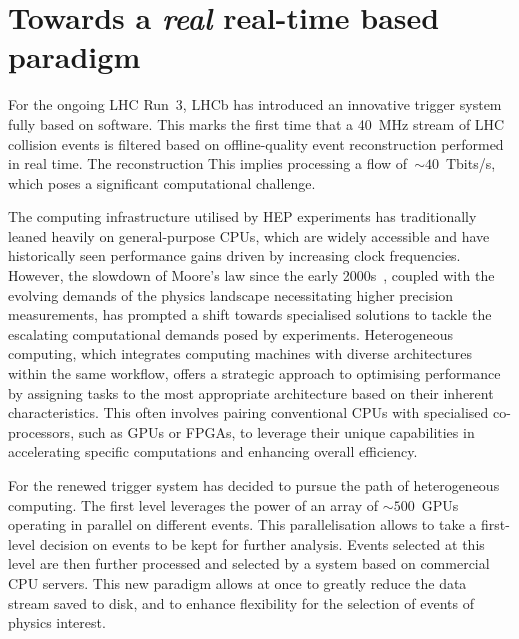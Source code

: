 \section{Towards a \textit{real} real-time based paradigm}
For the ongoing LHC Run~3, LHCb has introduced an innovative trigger system fully based on software. This marks the first time that a \SI{40}{\mega\hertz} stream of LHC collision events is filtered based on offline-quality event reconstruction performed in real time. The reconstruction This implies processing a flow of~$\sim 40$~Tbits/s, which poses a significant computational challenge. 

The computing infrastructure utilised by HEP experiments has traditionally leaned heavily on general-purpose CPUs, which are widely accessible and have historically seen performance gains driven by increasing clock frequencies. However, the slowdown of Moore's law since the early 2000s~\cite{Tuomi_2002}, coupled with the evolving demands of the physics landscape necessitating higher precision measurements, has prompted a shift towards specialised solutions to tackle the escalating computational demands posed by experiments. Heterogeneous computing, which integrates computing machines with diverse architectures within the same workflow, offers a strategic approach to optimising performance by assigning tasks to the most appropriate architecture based on their inherent characteristics. This often involves pairing conventional CPUs with specialised co-processors, such as GPUs or FPGAs, to leverage their unique capabilities in accelerating specific computations and enhancing overall efficiency.

For the renewed trigger system has decided to pursue the path of heterogeneous computing. The first level leverages the power of an array of $\sim 500$~GPUs operating in parallel on different events. This parallelisation allows to take a first-level decision on events to be kept for further analysis. Events selected at this level are then further processed and selected by a system based on commercial CPU servers. This new paradigm allows at once to greatly reduce the data stream saved to disk, and to enhance flexibility for the selection of events of physics interest. 


